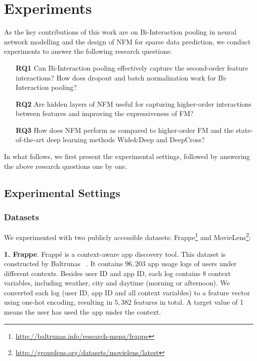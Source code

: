 \section{Experiments}
\label{sec:experiments}
As the key contributions of this work are on Bi-Interaction pooling in neural network modelling and the design of NFM for sparse data prediction, we conduct experiments to answer the following research questions:
\begin{itemize}
	\item[\textbf{RQ1}] Can Bi-Interaction pooling effectively capture the second-order feature interactions? How does dropout and batch normalization work for Bi-Interaction pooling? 
	\item[\textbf{RQ2}] Are hidden layers of NFM useful for capturing higher-order interactions between features and improving the expressiveness of FM? 
	\item[\textbf{RQ3}] How does NFM perform as compared to higher-order FM and the state-of-the-art deep learning methods Wide\&Deep and DeepCross?
\end{itemize}

In what follows, we first present the experimental settings, followed
by answering the above research questions one by one.

\subsection{Experimental Settings}
\subsubsection{\textbf{Datasets}} We experimented with two publicly accessible datasets: Frappe\footnote{\url{http://baltrunas.info/research-menu/frappe}} and MovieLens\footnote{\url{http://grouplens.org/datasets/movielens/latest}}: \\\vspace{-5pt}

\textbf{1. Frappe}.  Frapp\'e is a context-aware app discovery tool. This dataset is constructed by Baltrunas \etal~\cite{FrappeData}. It contains $96,203$ app usage logs of users under different contexts. Besides user ID and app ID, each log contains 8 context variables, including weather, city and daytime (\eg morning or afternoon). We converted each log (\ie user ID, app ID and all context variables) to a feature vector using one-hot encoding, resulting in $5,382$ features in total. A target value of 1 means the user has used the app under the context.  


